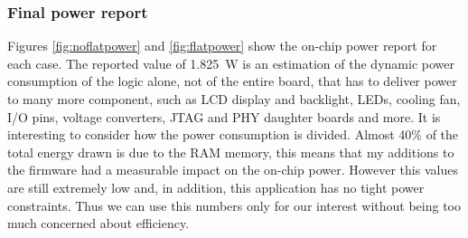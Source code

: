 \subsubsection{Final power report}
\noindent Figures \ref{fig:noflatpower} and \ref{fig:flatpower} show the on-chip power report for each case.
The reported value of 1.825~W is an estimation of the dynamic power consumption of the logic alone, not of the entire board, that has to deliver power to many more component, such as LCD display and backlight, LEDs, cooling fan, I/O pins, voltage converters, JTAG and PHY daughter boards and more.
It is interesting to consider how the power consumption is divided. Almost 40\% of the total energy drawn is due to the RAM memory, this means that my additions to the firmware had a measurable impact on the on-chip power. However this values are still extremely low and, in addition, this application has no tight power constraints.
Thus we can use this numbers only for our interest without being too much concerned about efficiency. 
